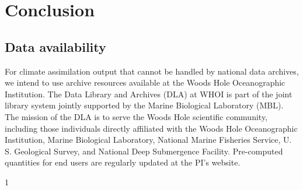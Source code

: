 \documentclass[authoryear,round,12pt]{article}
\begin{document}
\section{Conclusion}
\label{sec:conclusion}

\subsection{Data availability}
\label{sec:data-availability}

For climate assimilation output that cannot be handled by national data
archives, we intend to use archive resources available at the Woods
Hole Oceanographic Institution. The Data Library and Archives (DLA) at
WHOI is part of the joint library system jointly supported by the
Marine Biological Laboratory (MBL). The mission of the DLA is to serve
the Woods Hole scientific community, including those individuals
directly affiliated with the Woods Hole Oceanographic Institution,
Marine Biological Laboratory, National Marine Fisheries Service,
U. S. Geological Survey, and National Deep Submergence Facility.
Pre-computed quantities for end users are regularly updated at the PI's website.

\cite[e.g.,][]{Gebbie--2019:Atlantica}
\cite[]{Dickson--1995:XX}1

\clearpage
\newpage
{}
\footnotesize
\addtocounter{section}{1}


\end{document}
